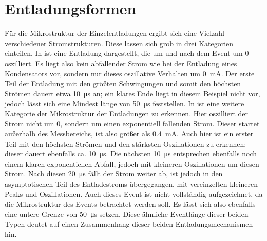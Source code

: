 \section{Entladungsformen}
\label{sec:dischargeforms}
Für die Mikrostruktur der Einzelentladungen ergibt sich eine Vielzahl verschiedener Stromstrukturen. Diese lassen sich grob in drei Kategorien einteilen. In  ist eine Entladung dargestellt, die um und nach dem Event um 0 oszilliert. Es liegt also kein abfallender Strom wie bei der Entladung eines Kondensators vor, sondern nur dieses oszillative Verhalten um \SI{0}{\milli\ampere}. Der erste Teil der Entladung mit den größten Schwingungen und somit den höchsten Strömen dauert etwa \SI{10}{\micro\second} an; ein klares Ende liegt in diesem Beispiel nicht vor, jedoch lässt sich eine Mindest länge von \SI{50}{\micro\second} feststellen.
In  ist eine weitere Kategorie der Mikrostruktur der Entladungen zu erkennen. Hier oszilliert der Strom nicht um 0, sondern um einen exponentiell fallenden Strom. Dieser startet außerhalb des Messbereichs, ist also größer als \SI{0,4}{\milli\ampere}. Auch hier ist ein erster Teil mit den höchsten Strömen und den stärksten Oszillationen zu erkennen; dieser dauert ebenfalls ca. \SI{10}{\micro\second}. Die nächsten \SI{10}{\micro\second} entsprechen ebenfalls noch einem klaren exponentiellen Abfall, jedoch mit kleineren Oszillationen um diesen Strom. Nach diesen \SI{20}{\micro\second} fällt der Strom weiter ab, ist jedoch in den asymptotischen Teil des Entladestroms übergegangen, mit vereinzelten kleineren Peaks und Oszillationen. Auch dieses Event ist nicht vollständig aufgezeichnet, da die Mikrostruktur des Events betrachtet werden soll. Es lässt sich also ebenfalls eine untere Grenze von \SI{50}{\micro\second} setzen. Diese ähnliche Eventlänge dieser beiden Typen deutet auf einen Zusammenhang dieser beiden Entladungsmechanismen hin.
